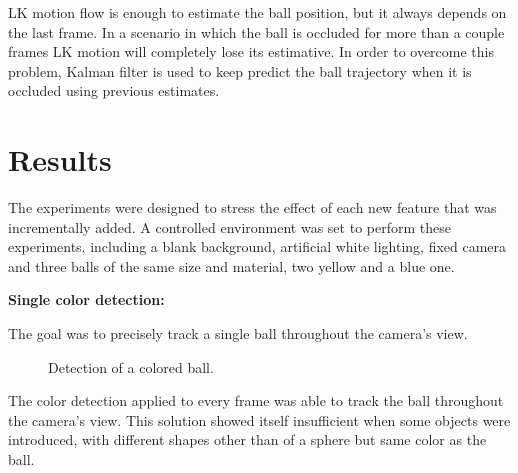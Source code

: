 \documentclass[10pt,twocolumn,letterpaper]{article}
\begin{document}
LK motion flow is enough to estimate the ball position, but it always depends on the last frame. In a scenario in which the ball is occluded for more than a couple frames  LK motion will completely lose its estimative. In order to overcome this problem, Kalman filter is used to keep predict the ball trajectory when it is occluded using previous estimates.

\section{Results}

  The experiments were designed to stress the effect of each new feature that
  was incrementally added. A controlled environment was set to perform these
  experiments, including a blank background, artificial white lighting, fixed
  camera and three balls of the same size and material, two yellow and a blue
  one.

  \bigbreak{}
  \textbf{Single color detection:}
  \bigbreak{}

  The goal was to precisely track a single ball throughout the camera's view.

  \begin{figure}[!h]
    \centering
    \setlength{\fboxsep}{1pt}
    \setlength{\fboxrule}{1pt}
    \caption{Detection of a colored ball.}\label{fig:single_color}
  \end{figure}

  The color detection applied to every frame was able to track the ball
  throughout the camera's view. This solution showed itself insufficient when
  some objects were introduced, with different shapes other than of a sphere but
  same color as the ball.
\end{document}
